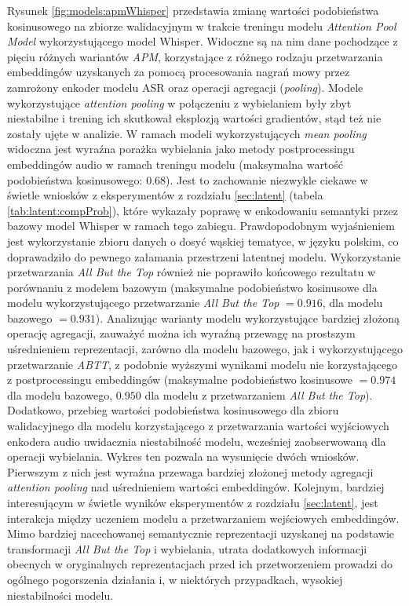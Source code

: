 Rysunek \ref{fig:models:apmWhisper} przedstawia zmianę wartości podobieństwa kosinusowego na zbiorze walidacyjnym w trakcie treningu modelu \textit{Attention Pool Model} wykorzystującego model Whisper. Widoczne są na nim dane pochodzące z pięciu różnych wariantów \textit{APM}, korzystające z różnego rodzaju przetwarzania embeddingów uzyskanych za pomocą procesowania nagrań mowy przez zamrożony enkoder modelu ASR oraz operacji agregacji (\textit{pooling}). Modele wykorzystujące \textit{attention pooling} w połączeniu z wybielaniem były zbyt niestabilne i trening ich skutkował eksplozją wartości gradientów, stąd też nie zostały ujęte w analizie. W ramach modeli wykorzystujących \textit{mean pooling} widoczna jest wyraźna porażka wybielania jako metody postprocessingu embeddingów audio w ramach treningu modelu (maksymalna wartość podobieństwa kosinusowego: $0.68$). Jest to zachowanie niezwykle ciekawe w świetle wniosków z eksperymentów z rozdziału \ref{sec:latent} (tabela \ref{tab:latent:compProb}), które wykazały poprawę w enkodowaniu semantyki przez bazowy model Whisper w ramach tego zabiegu. Prawdopodobnym wyjaśnieniem jest wykorzystanie zbioru danych o dosyć wąskiej tematyce, w języku polskim, co doprawadziło do pewnego załamania przestrzeni latentnej modelu. Wykorzystanie przetwarzania \textit{All But the Top} również nie poprawiło końcowego rezultatu w porównaniu z modelem bazowym (maksymalne podobieństwo kosinusowe dla modelu wykorzystującego przetwarzanie \textit{All But the Top} $=0.916$, dla modelu bazowego $=0.931$). Analizując warianty modelu wykorzystujące bardziej złożoną operację agregacji, zauważyć można ich wyraźną przewagę na prostszym uśrednieniem reprezentacji, zarówno dla modelu bazowego, jak i wykorzystującego przetwarzanie \textit{ABTT}, z podobnie wyższymi wynikami modelu nie korzystającego z postprocessingu embeddingów (maksymalne podobieństwo kosinusowe $=0.974$ dla modelu bazowego, $0.950$ dla modelu z przetwarzaniem \textit{All But the Top}). Dodatkowo, przebieg wartości podobieństwa kosinusowego dla zbioru walidacyjnego dla modelu korzystającego z przetwarzania wartości wyjściowych enkodera audio uwidacznia niestabilność modelu, wcześniej zaobserwowaną dla operacji wybielania. Wykres ten pozwala na wysunięcie dwóch wniosków. Pierwszym z nich jest wyraźna przewaga bardziej złożonej metody agregacji \textit{attention pooling} nad uśrednieniem wartości embeddingów. Kolejnym, bardziej interesującym w świetle wyników eksperymentów z rozdziału \ref{sec:latent}, jest interakcja między uczeniem modelu a przetwarzaniem wejściowych embeddingów. Mimo bardziej nacechowanej semantycznie reprezentacji uzyskanej na podstawie transformacji \textit{All But the Top} i wybielania, utrata dodatkowych informacji obecnych w oryginalnych reprezentacjach przed ich przetworzeniem prowadzi do ogólnego pogorszenia działania i, w niektórych przypadkach, wysokiej niestabilności modelu.

